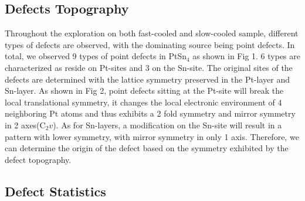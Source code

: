 \subsection{Defects Topography}
Throughout the exploration on both fast-cooled and slow-cooled sample, different types of defects are observed, with the dominating source being point defects. In total, we observed 9 types of point defects in PtSn$_4$ as shown in Fig 1. 6 types are characterized as reside on Pt-sites and 3 on the Sn-site. The original sites of the defects are determined with the lattice symmetry preserved in the Pt-layer and Sn-layer. As shown in Fig 2, point defects sitting at the Pt-site will break the local translational symmetry, it changes the local electronic environment of 4 neighboring Pt atoms and thus exhibits a 2 fold symmetry and mirror symmetry in 2 axes(C$_2v$). As for Sn-layers, a modification on the Sn-site will result in a pattern with lower symmetry, with mirror symmetry in only 1 axis. Therefore, we can determine the origin of the defect based on the symmetry exhibited by the defect topography. 

\subsection{Defect Statistics}

